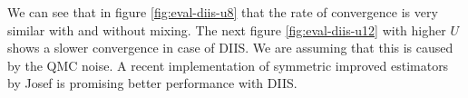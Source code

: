 We can see that in figure \ref{fig:eval-diis-u8} that the rate of convergence is very similar with and without mixing. The next figure \ref{fig:eval-diis-u12} with higher $U$ shows a slower convergence in case of DIIS. We are assuming that this is caused by the QMC noise. A recent implementation of symmetric improved estimators\cite{symmetric} by Josef is promising better performance with DIIS.

